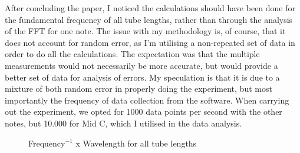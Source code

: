\documentclass{article}
\begin{document}
After concluding the paper, I noticed the calculations should have been done for the fundamental frequency of all tube lengths, rather than through the analysis of the FFT for one note. The issue with my methodology is, of course, that it does not account for random error, as I'm utilising a non-repeated set of data in order to do all the calculations. The expectation was that the multiple measurements would not necessarily be more accurate, but would provide a better set of data for analysis of errors. My speculation is that it is due to a mixture of both random error in properly doing the experiment, but most importantly the frequency of data collection from the software. When carrying out the experiment, we opted for 1000 data points per second with the other notes, but 10.000 for Mid C, which I utilised in the data analysis.

\begin{figure}[h!]
	\caption{Frequency$^{-1}$ x Wavelength for all tube lengths}
	\label{gr:}
\end{figure}
\end{document}
